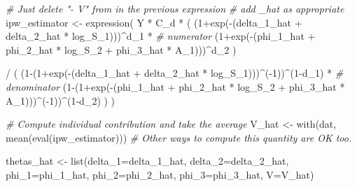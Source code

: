 \documentclass[
]{article}
\newenvironment{Shaded}{\begin{snugshade}}{\end{snugshade}}
\newcommand{\AttributeTok}[1]{\textcolor[rgb]{0.77,0.63,0.00}{#1}}
\newcommand{\CommentTok}[1]{\textcolor[rgb]{0.56,0.35,0.01}{\textit{#1}}}
\newcommand{\DecValTok}[1]{\textcolor[rgb]{0.00,0.00,0.81}{#1}}
\newcommand{\FunctionTok}[1]{\textcolor[rgb]{0.00,0.00,0.00}{#1}}
\newcommand{\NormalTok}[1]{#1}
\newcommand{\OtherTok}[1]{\textcolor[rgb]{0.56,0.35,0.01}{#1}}
\newcommand{\SpecialCharTok}[1]{\textcolor[rgb]{0.00,0.00,0.00}{#1}}
\begin{document}
\begin{Shaded}
\begin{Highlighting}[]
\CommentTok{\# Just delete "{-} V" from in the previous expression}
\CommentTok{\# add \_hat as appropriate}
\NormalTok{ipw\_estimator }\OtherTok{\textless{}{-}} \FunctionTok{expression}\NormalTok{( Y }\SpecialCharTok{*}\NormalTok{ C\_d }\SpecialCharTok{*}
\NormalTok{          (  (}\DecValTok{1}\SpecialCharTok{+}\FunctionTok{exp}\NormalTok{(}\SpecialCharTok{{-}}\NormalTok{(delta\_1\_hat }\SpecialCharTok{+}\NormalTok{ delta\_2\_hat }\SpecialCharTok{*}\NormalTok{ log\_S\_1)))}\SpecialCharTok{\^{}}\NormalTok{d\_1 }\SpecialCharTok{*} \CommentTok{\# numerator}
\NormalTok{             (}\DecValTok{1}\SpecialCharTok{+}\FunctionTok{exp}\NormalTok{(}\SpecialCharTok{{-}}\NormalTok{(phi\_1\_hat }\SpecialCharTok{+}\NormalTok{ phi\_2\_hat }\SpecialCharTok{*}\NormalTok{ log\_S\_2 }\SpecialCharTok{+}\NormalTok{ phi\_3\_hat }\SpecialCharTok{*}\NormalTok{ A\_1)))}\SpecialCharTok{\^{}}\NormalTok{d\_2  ) }
          
      \SpecialCharTok{/}\NormalTok{   (  (}\DecValTok{1}\SpecialCharTok{{-}}\NormalTok{(}\DecValTok{1}\SpecialCharTok{+}\FunctionTok{exp}\NormalTok{(}\SpecialCharTok{{-}}\NormalTok{(delta\_1\_hat }\SpecialCharTok{+}\NormalTok{ delta\_2\_hat }\SpecialCharTok{*}\NormalTok{ log\_S\_1)))}\SpecialCharTok{\^{}}\NormalTok{(}\SpecialCharTok{{-}}\DecValTok{1}\NormalTok{))}\SpecialCharTok{\^{}}\NormalTok{(}\DecValTok{1}\SpecialCharTok{{-}}\NormalTok{d\_1) }\SpecialCharTok{*} \CommentTok{\# denominator}
\NormalTok{             (}\DecValTok{1}\SpecialCharTok{{-}}\NormalTok{(}\DecValTok{1}\SpecialCharTok{+}\FunctionTok{exp}\NormalTok{(}\SpecialCharTok{{-}}\NormalTok{(phi\_1\_hat }\SpecialCharTok{+}\NormalTok{ phi\_2\_hat }\SpecialCharTok{*}\NormalTok{ log\_S\_2 }\SpecialCharTok{+}\NormalTok{ phi\_3\_hat }\SpecialCharTok{*}\NormalTok{ A\_1)))}\SpecialCharTok{\^{}}\NormalTok{(}\SpecialCharTok{{-}}\DecValTok{1}\NormalTok{))}\SpecialCharTok{\^{}}\NormalTok{(}\DecValTok{1}\SpecialCharTok{{-}}\NormalTok{d\_2)  )  }
\NormalTok{)}

\CommentTok{\# Compute individual contribution and take the average}
\NormalTok{V\_hat }\OtherTok{\textless{}{-}} \FunctionTok{with}\NormalTok{(dat, }\FunctionTok{mean}\NormalTok{(}\FunctionTok{eval}\NormalTok{(ipw\_estimator))) }\CommentTok{\# Other ways to compute this quantity are OK too.}

\NormalTok{thetas\_hat }\OtherTok{\textless{}{-}} \FunctionTok{list}\NormalTok{(}\AttributeTok{delta\_1=}\NormalTok{delta\_1\_hat,}
                   \AttributeTok{delta\_2=}\NormalTok{delta\_2\_hat,}
                   \AttributeTok{phi\_1=}\NormalTok{phi\_1\_hat,}
                   \AttributeTok{phi\_2=}\NormalTok{phi\_2\_hat,}
                   \AttributeTok{phi\_3=}\NormalTok{phi\_3\_hat,}
                   \AttributeTok{V=}\NormalTok{V\_hat)}
\end{Highlighting}
\end{Shaded}
\end{document}
